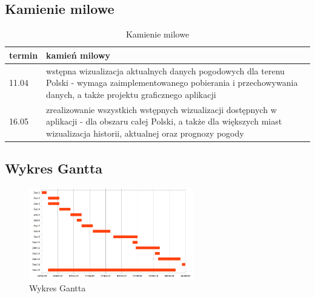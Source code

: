 \documentclass[10pt, a4paper]{article}
\begin{document}
\subsection{Kamienie milowe}
   \begin{table}[!h]
	\label{table_exres}
	\begin{tabular}{p{15mm}|p{120mm}}
		
		termin & kamień milowy\\ \hline
		11.04 & wstępna wizualizacja aktualnych danych pogodowych dla terenu Polski - wymaga zaimplementowanego pobierania i przechowywania danych, a także projektu graficznego aplikacji\\

		16.05 & zrealizowanie wszystkich wstępnych wizualizacji dostępnych w aplikacji - dla obszaru całej Polski, a także dla większych miast wizualizacja historii, aktualnej oraz prognozy pogody\\
	\end{tabular}
	\caption{Kamienie milowe}
\end{table}

\subsection{Wykres Gantta}
    \begin{figure}[h]
    \centering
	\includegraphics[width=0.64\textwidth]{wizualizacja_gantt.png}
	\caption{Wykres Gantta}
\end{figure}
\end{document}
